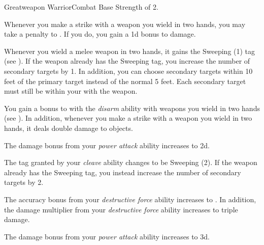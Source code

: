     \begin{feat}{Greatweapon Warrior}{Combat}
        \featpre Base Strength of 2.

         Whenever you make a strike with a weapon you wield in two hands, you may take a  penalty to .
        If you do, you gain a \plus1d bonus to damage.

         Whenever you wield a melee weapon in two hands, it gains the Sweeping (1) tag (see ).
        If the weapon already has the Sweeping tag, you increase the number of secondary targets by 1.
        In addition, you can choose secondary targets within 10 feet of the primary target instead of the normal 5 feet.
        Each secondary target must still be within your  with the weapon.

         You gain a  bonus to  with the \textit{disarm} ability with weapons you wield in two hands (see ).
        In addition, whenever you make a strike with a weapon you wield in two hands, it deals double damage to objects.

         The damage bonus from your \textit{power attack} ability increases to \plus2d.

         The tag granted by your \textit{cleave} ability changes to be Sweeping (2).
        If the weapon already has the Sweeping tag, you instead increase the number of secondary targets by 2.

         The accuracy bonus from your \textit{destructive force} ability increases to .
        In addition, the damage multiplier from your \textit{destructive force} ability increases to triple damage.

         The damage bonus from your \textit{power attack} ability increases to \plus3d.
    \end{feat}

